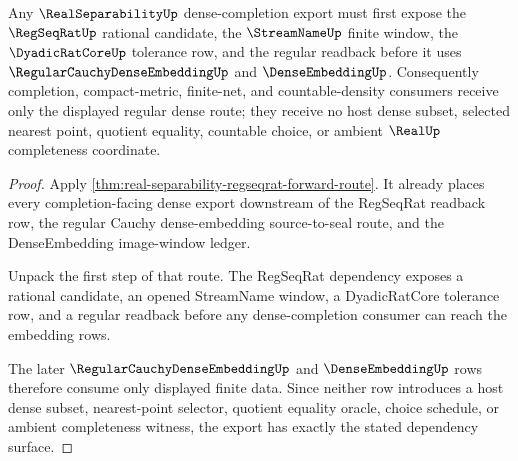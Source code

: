 \begin{theorem}
\label{thm:real-separability-regseqrat-forward-dependency}
Any $\RealSeparabilityUp$ dense-completion export must first expose the $\RegSeqRatUp$ rational candidate, the $\StreamNameUp$ finite window, the $\DyadicRatCoreUp$ tolerance row, and the regular readback before it uses $\RegularCauchyDenseEmbeddingUp$ and $\DenseEmbeddingUp$. Consequently completion, compact-metric, finite-net, and countable-density consumers receive only the displayed regular dense route; they receive no host dense subset, selected nearest point, quotient equality, countable choice, or ambient $\RealUp$ completeness coordinate.
\end{theorem}
\begin{proof}
Apply \autoref{thm:real-separability-regseqrat-forward-route}. It already places every completion-facing dense export downstream of the RegSeqRat readback row, the regular Cauchy dense-embedding source-to-seal route, and the DenseEmbedding image-window ledger.

Unpack the first step of that route. The RegSeqRat dependency exposes a rational candidate, an opened StreamName window, a DyadicRatCore tolerance row, and a regular readback before any dense-completion consumer can reach the embedding rows.

The later $\RegularCauchyDenseEmbeddingUp$ and $\DenseEmbeddingUp$ rows therefore consume only displayed finite data. Since neither row introduces a host dense subset, nearest-point selector, quotient equality oracle, choice schedule, or ambient completeness witness, the export has exactly the stated dependency surface.
\end{proof}

